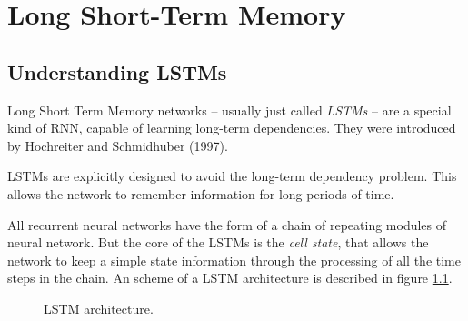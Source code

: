 
\chapter{Long Short-Term Memory} %

\label{Chapter4} %


\section{Understanding LSTMs}

Long Short Term Memory networks – usually just called \textit{LSTMs} – are a special kind of RNN, capable of learning long-term dependencies. They were introduced by Hochreiter and Schmidhuber (1997).

LSTMs are explicitly designed to avoid the long-term dependency problem. This allows the network to remember information for long periods of time.

All recurrent neural networks have the form of a chain of repeating modules of neural network. But the core of the LSTMs is the \textit{cell state}, that allows the network to keep a simple state information through the processing of all the time steps in the chain. An scheme of a LSTM architecture is described in figure \ref{fig:lstm}.

\begin{figure}[H]
\begin{center}
\end{center}
\decoRule
\caption[LSTM architecture]{LSTM architecture.}
\label{fig:lstm}
\end{figure}

